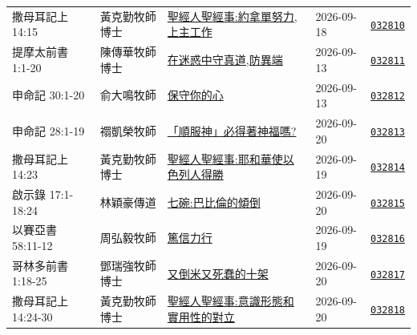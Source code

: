 \documentclass{book}
\begin{document}
{\begin{xltabular}{\textwidth}{|p{0.15\textwidth} p{0.15\textwidth} p{0.45\textwidth}|p{0.07\textwidth} p{0.1\textwidth}|}
撒母耳記上 14:15 & 黃克勤牧師博士 & \hyperref[sec:032810]{聖經人聖經事:約拿單努力,上主工作} & 2026-09-18 & \href{http://www.church.com.hk/acms/content.asp?site=cdc\&op=show\&type=product\&code=032810\&layout=sermon}{\texttt{032810}} \\
提摩太前書 1:1-20 & 陳傳華牧師博士 & \hyperref[sec:032811]{在迷惑中守真道,防異端} & 2026-09-13 & \href{http://www.church.com.hk/acms/content.asp?site=cdc\&op=show\&type=product\&code=032811\&layout=sermon}{\texttt{032811}} \\
申命記 30:1-20 & 俞大鳴牧師 & \hyperref[sec:032812]{保守你的心} & 2026-09-13 & \href{http://www.church.com.hk/acms/content.asp?site=cdc\&op=show\&type=product\&code=032812\&layout=sermon}{\texttt{032812}} \\
申命記 28:1-19 & 禤凱榮牧師 & \hyperref[sec:032813]{「順服神」必得著神福嗎?} & 2026-09-20 & \href{http://www.church.com.hk/acms/content.asp?site=cdc\&op=show\&type=product\&code=032813\&layout=sermon}{\texttt{032813}} \\
撒母耳記上 14:23 & 黃克勤牧師博士 & \hyperref[sec:032814]{聖經人聖經事:耶和華使以色列人得勝} & 2026-09-19 & \href{http://www.church.com.hk/acms/content.asp?site=cdc\&op=show\&type=product\&code=032814\&layout=sermon}{\texttt{032814}} \\
啟示錄 17:1-18:24 & 林穎豪傳道 & \hyperref[sec:032815]{七碗:巴比倫的傾倒} & 2026-09-20 & \href{http://www.church.com.hk/acms/content.asp?site=cdc\&op=show\&type=product\&code=032815\&layout=sermon}{\texttt{032815}} \\
以賽亞書 58:11-12 & 周弘毅牧師 & \hyperref[sec:032816]{篤信力行} & 2026-09-19 & \href{http://www.church.com.hk/acms/content.asp?site=cdc\&op=show\&type=product\&code=032816\&layout=sermon}{\texttt{032816}} \\
哥林多前書 1:18-25 & 鄧瑞強牧師博士 & \hyperref[sec:032817]{又倒米又死蠢的十架} & 2026-09-20 & \href{http://www.church.com.hk/acms/content.asp?site=cdc\&op=show\&type=product\&code=032817\&layout=sermon}{\texttt{032817}} \\
撒母耳記上 14:24-30 & 黃克勤牧師博士 & \hyperref[sec:032818]{聖經人聖經事:意識形態和實用性的對立} & 2026-09-20 & \href{http://www.church.com.hk/acms/content.asp?site=cdc\&op=show\&type=product\&code=032818\&layout=sermon}{\texttt{032818}} \\
\end{xltabular}
}
\newpage
\end{document}
